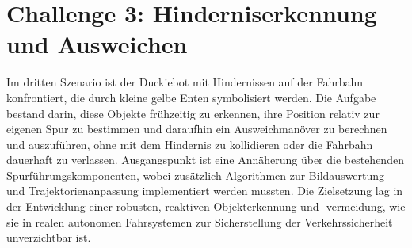 \chapter{Challenge 3: Hinderniserkennung und Ausweichen}
\label{ch:Challenge_3}


Im dritten Szenario ist der Duckiebot mit Hindernissen auf der Fahrbahn konfrontiert, die durch kleine gelbe Enten 
symbolisiert werden. Die Aufgabe bestand darin, diese Objekte frühzeitig zu erkennen, ihre Position relativ zur 
eigenen Spur zu bestimmen und daraufhin ein Ausweichmanöver zu berechnen und auszuführen, ohne mit dem Hindernis 
zu kollidieren oder die Fahrbahn dauerhaft zu verlassen. Ausgangspunkt ist eine Annäherung über die bestehenden 
Spurführungskomponenten, wobei zusätzlich Algorithmen zur Bildauswertung und Trajektorienanpassung implementiert 
werden mussten. Die Zielsetzung lag in der Entwicklung einer robusten, reaktiven Objekterkennung und -vermeidung, 
wie sie in realen autonomen Fahrsystemen zur Sicherstellung der Verkehrssicherheit unverzichtbar ist. 